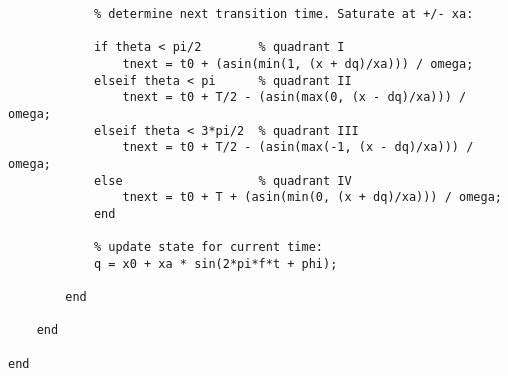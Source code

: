 \begin{lstlisting}
            % determine next transition time. Saturate at +/- xa:
            
            if theta < pi/2        % quadrant I
                tnext = t0 + (asin(min(1, (x + dq)/xa))) / omega;
            elseif theta < pi      % quadrant II
                tnext = t0 + T/2 - (asin(max(0, (x - dq)/xa))) / omega;
            elseif theta < 3*pi/2  % quadrant III
                tnext = t0 + T/2 - (asin(max(-1, (x - dq)/xa))) / omega;
            else                   % quadrant IV
                tnext = t0 + T + (asin(min(0, (x + dq)/xa))) / omega;
            end
            
            % update state for current time:
            q = x0 + xa * sin(2*pi*f*t + phi);

        end
        
    end

end  
    
    
\end{lstlisting}    
